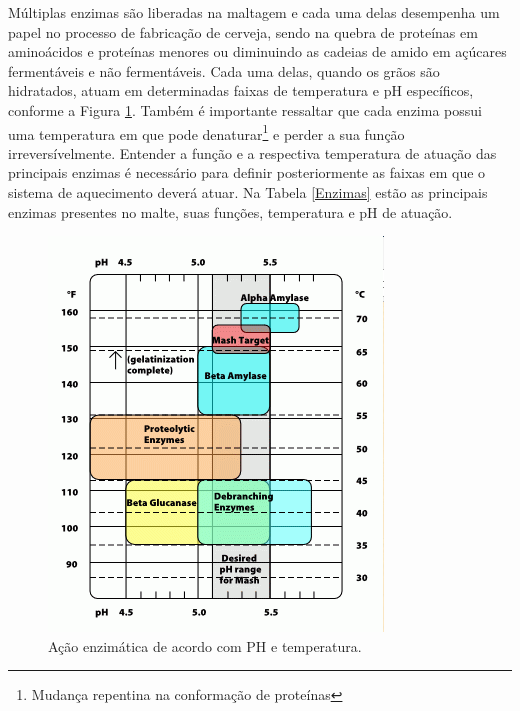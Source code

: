 Múltiplas enzimas são liberadas na maltagem e cada uma delas desempenha um papel no processo de fabricação de cerveja, sendo na quebra de proteínas em aminoácidos e proteínas menores ou diminuindo as cadeias de amido em açúcares fermentáveis e não fermentáveis. Cada uma delas, quando os grãos são hidratados,  atuam em determinadas faixas de temperatura e pH específicos, conforme a Figura \ref{acaoenzimatica}. Também é importante ressaltar que cada enzima possui uma temperatura em que pode denaturar\footnote{Mudança repentina na conformação de proteínas} e perder a sua função irreversívelmente. Entender a função e a respectiva temperatura de atuação das principais enzimas é necessário para definir posteriormente as faixas em que o sistema de aquecimento deverá atuar. Na Tabela \ref{Enzimas} estão as principais enzimas presentes no malte, suas funções, temperatura e pH de atuação.

\begin{figure}[htb]
	\caption{\label{acaoenzimatica} Ação enzimática de acordo com PH e temperatura.}
	\begin{center}
	    \includegraphics[width=0.75\linewidth]{./img/acaoenzimatica.png}
	\end{center}
\end{figure}

